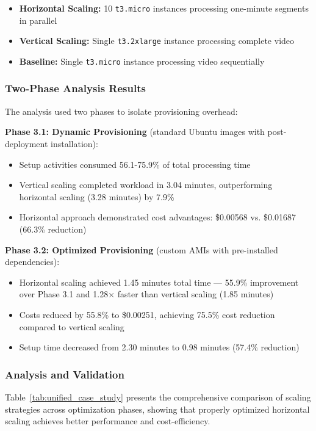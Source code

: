 \documentclass[conference]{IEEEtran}
\begin{document}
	\begin{itemize}
		\item \textbf{Horizontal Scaling:} 10 \texttt{t3.micro} instances processing one-minute segments in parallel
		\item \textbf{Vertical Scaling:} Single \texttt{t3.2xlarge} instance processing complete video
		\item \textbf{Baseline:} Single \texttt{t3.micro} instance processing video sequentially
	\end{itemize}
	
	\subsubsection{Two-Phase Analysis Results}
	
	The analysis used two phases to isolate provisioning overhead:
	
	\textbf{Phase 3.1: Dynamic Provisioning} (standard Ubuntu images with post-deployment installation):
	\begin{itemize}
		\item Setup activities consumed 56.1-75.9\% of total processing time
		\item Vertical scaling completed workload in 3.04 minutes, outperforming horizontal scaling (3.28 minutes) by 7.9\%
		\item Horizontal approach demonstrated cost advantages: \$0.00568 vs. \$0.01687 (66.3\% reduction)
	\end{itemize}
	
	\textbf{Phase 3.2: Optimized Provisioning} (custom AMIs with pre-installed dependencies):
	\begin{itemize}
		\item Horizontal scaling achieved 1.45 minutes total time — 55.9\% improvement over Phase 3.1 and 1.28× faster than vertical scaling (1.85 minutes)
		\item Costs reduced by 55.8\% to \$0.00251, achieving 75.5\% cost reduction compared to vertical scaling
		\item Setup time decreased from 2.30 minutes to 0.98 minutes (57.4\% reduction)
	\end{itemize}
	
	\subsubsection{Analysis and Validation}
	
	Table~\ref{tab:unified_case_study} presents the comprehensive comparison of scaling strategies across optimization phases, showing that properly optimized horizontal scaling achieves better performance and cost-efficiency.
	
\end{document}
